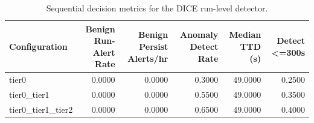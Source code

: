\begin{table}[t]
\centering
\caption{Sequential decision metrics for the DICE run-level detector.}
\label{tab:dice_sequential_metrics}
\footnotesize
\begin{tabular}{lrrrrr}
\toprule
Configuration & Benign Run-Alert Rate & Benign Persist Alerts/hr & Anomaly Detect Rate & Median TTD (s) & Detect <=300s \\
\midrule
tier0 & 0.0000 & 0.0000 & 0.3000 & 49.0000 & 0.2500 \\
tier0_tier1 & 0.0000 & 0.0000 & 0.5500 & 49.0000 & 0.3500 \\
tier0_tier1_tier2 & 0.0000 & 0.0000 & 0.6500 & 49.0000 & 0.4000 \\
\bottomrule
\end{tabular}

\end{table}
